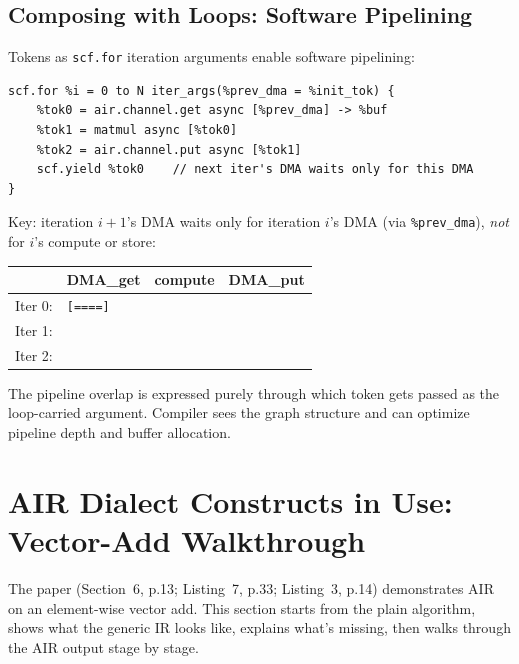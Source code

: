 \documentclass[11pt,a4paper]{article}
\begin{document}
\subsection{Composing with Loops: Software Pipelining}

Tokens as \texttt{scf.for} iteration arguments enable software pipelining:

\begin{lstlisting}
scf.for %i = 0 to N iter_args(%prev_dma = %init_tok) {
    %tok0 = air.channel.get async [%prev_dma] -> %buf
    %tok1 = matmul async [%tok0]
    %tok2 = air.channel.put async [%tok1]
    scf.yield %tok0    // next iter's DMA waits only for this DMA
}
\end{lstlisting}

Key: iteration $i{+}1$'s DMA waits only for iteration $i$'s DMA (via
\texttt{\%prev\_dma}), \emph{not} for $i$'s compute or store:

\begin{center}
\begin{tabular}{llll}
\toprule
& DMA\_get & compute & DMA\_put \\
\midrule
Iter 0: & \texttt{[====]} & \texttt{\quad[====]} & \texttt{\qquad[====]} \\
Iter 1: & \texttt{\quad[====]} & \texttt{\qquad[====]} & \texttt{\quad\qquad[====]} \\
Iter 2: & \texttt{\qquad[====]} & \texttt{\quad\qquad[====]} & \\
\bottomrule
\end{tabular}
\end{center}

The pipeline overlap is expressed purely through which token gets passed as
the loop-carried argument. Compiler sees the graph structure and can optimize
pipeline depth and buffer allocation.


\section{AIR Dialect Constructs in Use: Vector-Add Walkthrough}

The paper (Section~6, p.13; Listing~7, p.33; Listing~3, p.14) demonstrates AIR on
an element-wise vector add. This section starts from the plain algorithm, shows what
the generic IR looks like, explains what's missing, then walks through the AIR output
stage by stage.
\end{document}
